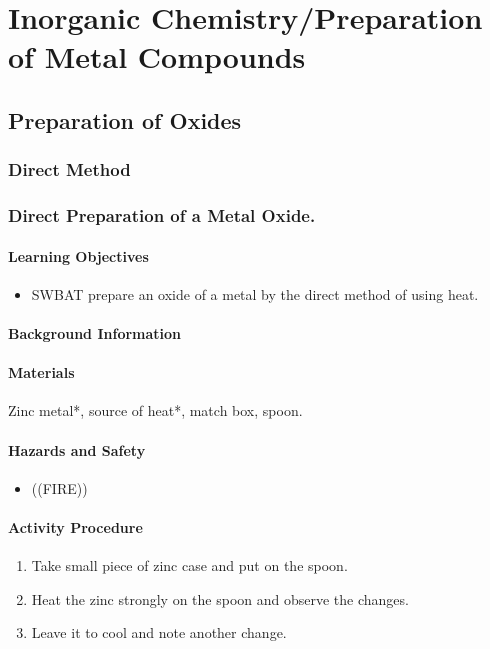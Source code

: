 \chapter{Inorganic Chemistry/Preparation of Metal Compounds}

\section{Preparation of Oxides}

\subsection{Direct Method}

\subsection{Direct Preparation of a Metal Oxide.}

\subsubsection*{Learning Objectives}
\begin{itemize}
\item{SWBAT prepare an oxide of a metal by the direct method of using heat.}
\end{itemize}

\subsubsection*{Background Information}


\subsubsection*{Materials}
Zinc metal*, source of heat*, match box, spoon.

\subsubsection*{Hazards and Safety}
\begin{itemize}
\item{((FIRE))}
\end{itemize}

\subsubsection*{Activity Procedure}
\begin{enumerate}
\item{Take small piece of zinc case and put on the spoon.}
\item{Heat the zinc strongly on the spoon and observe the changes.}
\item{Leave it to cool and note another change.}
\end{enumerate}

